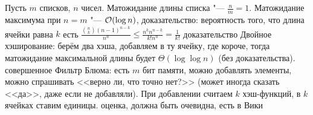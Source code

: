 \section{} %
Пусть $m$ списков, $n$ чисел.
Матожидание длины списка "--- $\frac{n}{m} = 1$.
Матожидание максимума при $n=m$ "--- $\mathcal{O}(\log n)$, доказательство: вероятность того, что длина ячейки равна $k$ есть
$\frac{\binom{n}{k}(n-1)^{n-k}}{n^n} \le \frac{n^kn^{n-k}}{k!n^n} = \frac{1}{k!}$
\TODO доказательство
Двойное хэширование: берём два хэша, добавляем в ту ячейку, где короче, тогда матожидание максимальной длины будет $\Theta (\log \log n)$ (без доказательства).
\TODO совершенное
Фильтр Блюма: есть $m$ бит памяти, можно добавлять элементы, можно спрашивать <<верно ли, что точно нет?>> (может иногда сказать <<да>>, даже если не добавляли).
При добавлении считаем $k$ хэш-функций, в $k$ ячейках ставим единицы.
\TODO оценка, должна быть очевидна, есть в Вики
